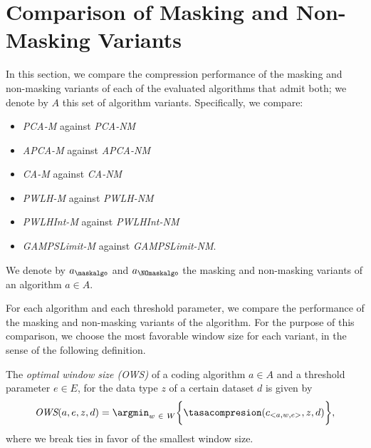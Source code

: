 
\section{Comparison of Masking and Non-Masking Variants}
\label{secX:rendimiento-relativo}


In this section, we compare the compression performance of the masking and non-masking variants of each of the evaluated algorithms that admit both; we denote by $A$ this set of algorithm variants. Specifically, we compare:


\vspace{-5pt}
\begin{itemize}
    \item \textit{PCA-M} against \textit{PCA-NM}
    \item \textit{APCA-M} against \textit{APCA-NM}
    \item \textit{CA-M} against \textit{CA-NM}
    \item \textit{PWLH-M} against \textit{PWLH-NM}
    \item \textit{PWLHInt-M} against \textit{PWLHInt-NM} 
    \item \textit{GAMPSLimit-M} against \textit{GAMPSLimit-NM}.
\end{itemize}


\vspace{+3pt}
\begin{notation}
We denote by $a_\maskalgo$ and $a_\NOmaskalgo$ the masking and non-masking variants of an algorithm $a\in A$.
\end{notation}


For each algorithm and each threshold parameter, we compare the performance of the masking and non-masking variants of the algorithm. For the purpose of this comparison, we choose the most favorable window size for each variant, in the sense of the following definition.


\newcommand{\owsit}{\textit{OWS}}
\newcommand{\ows}{\text{OWS\ }}
\newcommand{\owsns}{\text{OWS}}

\begin{defcion}
The \textit{optimal window size (\owsit)} of a coding algorithm $a \in A$ and a threshold parameter $e \in E$, for the data type $z$ of a certain dataset $d$ is given by
\begin{equation}
\label{eq:ows}
\owsit(a, e, z, d) = \argmin_{w\ \in \ W} \biggl\{ \tasacompresion(c_{<a, w, e>}, z, d) \biggr\},
\end{equation}
where we break ties in favor of the smallest window size.
\end{defcion}


